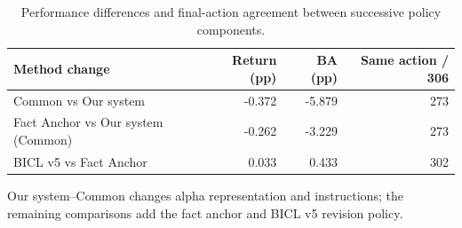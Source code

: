 \begin{table}[H]
\centering\small
\setlength{\tabcolsep}{3pt}
\renewcommand{\arraystretch}{1.12}
\caption{Performance differences and final-action agreement between successive policy components.}
\label{tab:u09-bridge}
\begin{tabular}{@{}lrrr@{}}
\toprule
Method change & Return (pp) & BA (pp) & Same action / 306 \\
\midrule
Common vs Our system & -0.372 & -5.879 & 273 \\
Fact Anchor vs Our system (Common) & -0.262 & -3.229 & 273 \\
BICL v5 vs Fact Anchor & 0.033 & 0.433 & 302 \\
\bottomrule
\end{tabular}\par\medskip
\begin{minipage}{\textwidth}\footnotesize Our system--Common changes alpha representation and instructions; the remaining comparisons add the fact anchor and BICL v5 revision policy.\end{minipage}
\end{table}
